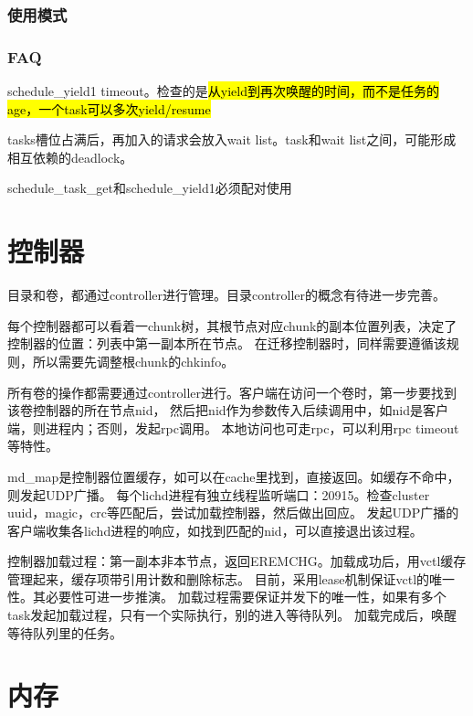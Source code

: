 \subsubsection{使用模式}

\subsubsection{FAQ}

\begin{compactenum}
\item schedule\_yield1 timeout。检查的是\hl{从yield到再次唤醒的时间，而不是任务的age，一个task可以多次yield/resume}
\item tasks槽位占满后，再加入的请求会放入wait list。task和wait list之间，可能形成相互依赖的deadlock。
\item schedule\_task\_get和schedule\_yield1必须配对使用
\end{compactenum}

\section{控制器}

目录和卷，都通过controller进行管理。目录controller的概念有待进一步完善。

每个控制器都可以看着一chunk树，其根节点对应chunk的副本位置列表，决定了控制器的位置：列表中第一副本所在节点。
在迁移控制器时，同样需要遵循该规则，所以需要先调整根chunk的chkinfo。

所有卷的操作都需要通过controller进行。客户端在访问一个卷时，第一步要找到该卷控制器的所在节点nid，
然后把nid作为参数传入后续调用中，如nid是客户端，则进程内；否则，发起rpc调用。
本地访问也可走rpc，可以利用rpc timeout等特性。

md\_map是控制器位置缓存，如可以在cache里找到，直接返回。如缓存不命中，则发起UDP广播。
每个lichd进程有独立线程监听端口：20915。检查cluster uuid，magic，crc等匹配后，尝试加载控制器，然后做出回应。
发起UDP广播的客户端收集各lichd进程的响应，如找到匹配的nid，可以直接退出该过程。

控制器加载过程：第一副本非本节点，返回EREMCHG。加载成功后，用vctl缓存管理起来，缓存项带引用计数和删除标志。
目前，采用lease机制保证vctl的唯一性。其必要性可进一步推演。
加载过程需要保证并发下的唯一性，如果有多个task发起加载过程，只有一个实际执行，别的进入等待队列。
加载完成后，唤醒等待队列里的任务。

\section{内存}


